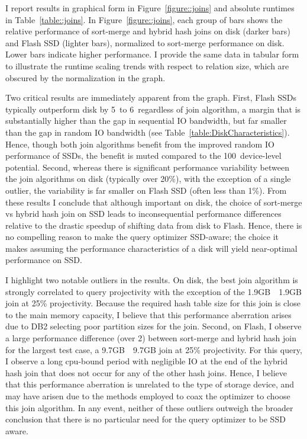 I report results in graphical form in Figure~\ref{figure::joins} and absolute runtimes in Table~\ref{table::joins}.
In Figure~\ref{figure::joins}, each group of bars shows the relative performance of sort-merge and hybrid hash joins on disk (darker bars) and Flash SSD (lighter bars), normalized to sort-merge performance on disk.
Lower bars indicate higher performance.
I provide the same data in tabular form to illustrate the runtime scaling trends with respect to relation size, which are obscured by the normalization in the graph.

Two critical results are immediately apparent from the graph.  
First, Flash SSDs typically outperform disk by 5\texttimes~to 6\texttimes~regardless of join algorithm, a margin that is substantially higher than the gap in sequential IO bandwidth, but far smaller than the gap in random IO bandwidth (see Table~\ref{table:DiskCharacteristics}).
Hence, though both join algorithms benefit from the improved random IO performance of SSDs, the benefit is muted compared to the 100\texttimes~device-level potential.
Second, whereas there is significant performance variability between the join algorithms on disk (typically over 20\%), with the exception of a single outlier, the variability is far smaller on Flash SSD (often less than 1\%).
From these results I conclude that although important on disk, the choice of sort-merge vs hybrid hash join on SSD leads to inconsequential performance differences relative to the drastic speedup of shifting data from disk to Flash.
Hence, there is no compelling reason to make the query optimizer SSD-aware; the choice it makes assuming the performance characteristics of a disk will yield near-optimal performance on SSD.



I highlight two notable outliers in the results.
On disk, the best join algorithm is strongly correlated to query projectivity with the exception of the 1.9GB~\texttimes~1.9GB join at 25\% projectivity.
Because the required hash table size for this join is close to the main memory capacity, I believe that this performance aberration arises due to DB2 selecting poor partition sizes for the join.
Second, on Flash, I observe a large performance difference (over 2\texttimes) between sort-merge and hybrid hash join for the largest test case, a 9.7GB~\texttimes~9.7GB join at 25\% projectivity.
For this query, I observe a long cpu-bound period with negligible IO at the end of the hybrid hash join that does not occur for any of the other hash joins.
Hence, I believe that this performance aberration is unrelated to the type of storage device, and may have arisen due to the methods employed to coax the optimizer to choose this join algorithm.
In any event, neither of these outliers outweigh the broader conclusion that there is no particular need for the query optimizer to be SSD aware.

